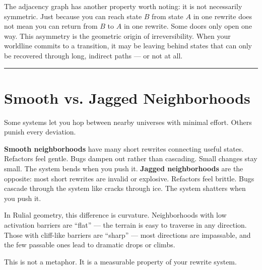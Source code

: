 The adjacency graph has another property worth noting: it is not necessarily symmetric. Just because you can reach state $B$ from state $A$ in one rewrite does not mean you can return from $B$ to $A$ in one rewrite. Some doors only open one way. This asymmetry is the geometric origin of irreversibility. When your worldline commits to a transition, it may be leaving behind states that can only be recovered through long, indirect paths --- or not at all.

\begin{center}\rule{0.5\linewidth}{0.5pt}\end{center}

\section{Smooth vs. Jagged Neighborhoods}
\label{7.3-smooth-vs-jagged}

Some systems let you hop between nearby universes with minimal effort. Others punish every deviation.

\textbf{Smooth neighborhoods} have many short rewrites connecting useful states. Refactors feel gentle. Bugs dampen out rather than cascading. Small changes stay small. The system bends when you push it. \textbf{Jagged neighborhoods} are the opposite: most short rewrites are invalid or explosive. Refactors feel brittle. Bugs cascade through the system like cracks through ice. The system shatters when you push it.

In Rulial geometry, this difference is curvature. Neighborhoods with low activation barriers are ``flat'' --- the terrain is easy to traverse in any direction. Those with cliff-like barriers are ``sharp'' --- most directions are impassable, and the few passable ones lead to dramatic drops or climbs.

This is not a metaphor. It is a measurable property of your rewrite system.

